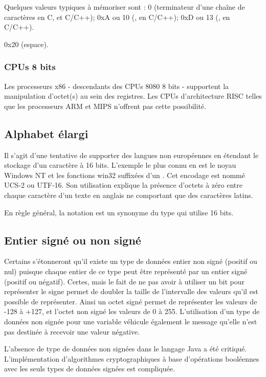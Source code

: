 Quelques valeurs typiques à mémoriser sont :
0 (terminateur d'une chaîne de caractères en C,  et C/C++);
0xA ou 10 (,  en C/C++);
0xD ou 13 (,  en C/C++).

0x20 (espace).

\subsubsection{CPUs 8 bits}

Les processeurs x86 - descendants des CPUs 8080 8 bits - supportent la manipulation d'octet(s) au sein des registres.
Les CPUs d'architecture RISC telles que les processeurs ARM et MIPS n'offrent pas cette possibilité.

\subsection{Alphabet élargi}

Il s'agit d'une tentative de supporter des langues non européennes en étendant le stockage d'un caractère à 16 bits.
L'exemple le plus connu en est le noyau Windows NT et les fonctions win32 suffixées d'un .
Cet encodage est nommé UCS-2 ou UTF-16.
Son utilisation explique la présence d'octets à zéro entre chaque caractère d'un texte en anglais ne comportant que des caractères latins.

En règle général, la notation  est un synonyme du type  qui utilise 16 bits.

\subsection{Entier signé ou non signé}

Certains s'étonneront qu'il existe un type de données entier non signé (positif ou nul) puisque chaque entier de ce type peut être représenté par un entier signé (positif ou négatif).
Certes, mais le fait de ne pas avoir à utiliser un bit pour représenter le signe permet de doubler la taille de l'intervalle des valeurs qu'il est possible de représenter.
Ainsi un octet signé permet de représenter les valeurs de -128 à +127, et l'octet non signé les valeurs de 0 à 255.
L'utilisation d'un type de données non signée pour une variable véhicule également le message qu'elle n'est pas destinée à recevoir une valeur négative.

L'absence de type de données non signées dans le langage Java a été critiqué.
L'implémentation d'algorithmes cryptographiques à base d'opérations booléennes avec les seuls types de données signées est compliquée.

